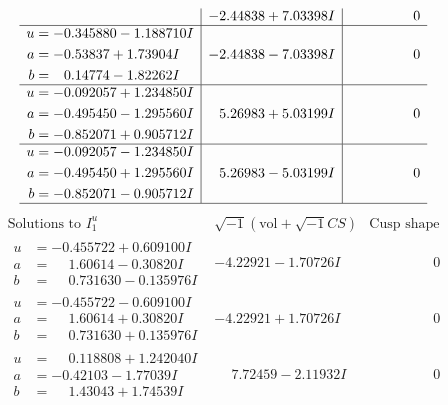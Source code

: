 \documentclass[1p]{elsarticle_modified}
\theoremstyle{definition}
\newcommand{\I}{\sqrt{-1}}
\begin{document}
$$\begin{array}{c|c|c}
 & -2.44838 + 7.03398 I & \phantom{-0.000000 } 0 \\ \hline\begin{aligned}
u &= -0.345880 - 1.188710 I \\
a &= -0.53837 + 1.73904 I \\
b &= \phantom{-}0.14774 - 1.82262 I\end{aligned}
 & -2.44838 - 7.03398 I & \phantom{-0.000000 } 0 \\ \hline\begin{aligned}
u &= -0.092057 + 1.234850 I \\
a &= -0.495450 - 1.295560 I \\
b &= -0.852071 + 0.905712 I\end{aligned}
 & \phantom{-}5.26983 + 5.03199 I & \phantom{-0.000000 } 0 \\ \hline\begin{aligned}
u &= -0.092057 - 1.234850 I \\
a &= -0.495450 + 1.295560 I \\
b &= -0.852071 - 0.905712 I\end{aligned}
 & \phantom{-}5.26983 - 5.03199 I & \phantom{-0.000000 } 0\\
 \hline 
 \end{array}$$\newpage$$\begin{array}{c|c|c}  
\text{Solutions to }I^u_{1}& \I (\text{vol} + \sqrt{-1}CS) & \text{Cusp shape}\\
 \hline 
\begin{aligned}
u &= -0.455722 + 0.609100 I \\
a &= \phantom{-}1.60614 - 0.30820 I \\
b &= \phantom{-}0.731630 - 0.135976 I\end{aligned}
 & -4.22921 - 1.70726 I & \phantom{-0.000000 } 0 \\ \hline\begin{aligned}
u &= -0.455722 - 0.609100 I \\
a &= \phantom{-}1.60614 + 0.30820 I \\
b &= \phantom{-}0.731630 + 0.135976 I\end{aligned}
 & -4.22921 + 1.70726 I & \phantom{-0.000000 } 0 \\ \hline\begin{aligned}
u &= \phantom{-}0.118808 + 1.242040 I \\
a &= -0.42103 - 1.77039 I \\
b &= \phantom{-}1.43043 + 1.74539 I\end{aligned}
 & \phantom{-}7.72459 - 2.11932 I & \phantom{-0.000000 } 0 \\ \hline\begin{aligned}

\end{aligned}
\end{array}$$
\end{document}
